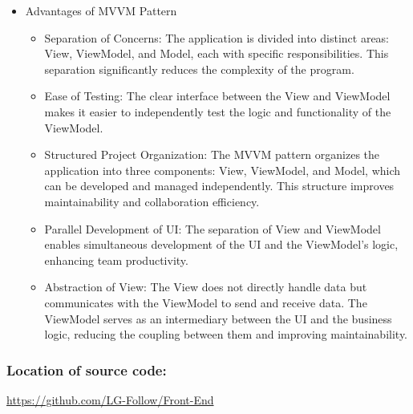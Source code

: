 \documentclass[conference]{IEEEtran}
\begin{document}
\begin{itemize}
    \item Advantages of MVVM Pattern
\begin{itemize}
    \item Separation of Concerns: The application is divided into distinct areas: View, ViewModel, and Model, each with specific responsibilities. This separation significantly reduces the complexity of the program.\\
    \item Ease of Testing: The clear interface between the View and ViewModel makes it easier to independently test the logic and functionality of the ViewModel.\\
    \item Structured Project Organization: The MVVM pattern organizes the application into three components: View, ViewModel, and Model, which can be developed and managed independently. This structure improves maintainability and collaboration efficiency.\\
    \item Parallel Development of UI: The separation of View and ViewModel enables simultaneous development of the UI and the ViewModel’s logic, enhancing team productivity.\\
    \item Abstraction of View: The View does not directly handle data but communicates with the ViewModel to send and receive data. The ViewModel serves as an intermediary between the UI and the business logic, reducing the coupling between them and improving maintainability.\\  
\end{itemize}
\end{itemize}

\subsubsection{Location of source code:}
\url{https://github.com/LG-Follow/Front-End}\\
\end{document}
